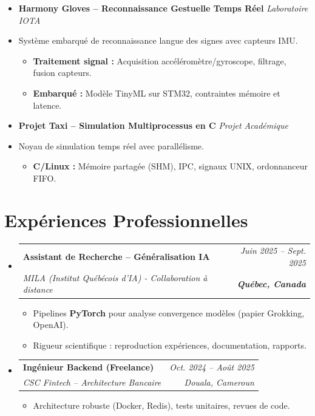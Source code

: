 \documentclass[a4paper,11pt]{article}
\makeatletter
\newcommand{\resumeSubheading}[4]{
  \vspace{-1pt}\item
    \begin{tabular*}{0.97\textwidth}[t]{l@{\extracolsep{\fill}}r}
      \textbf{#1} & \textit{\small #2} \\
      \textit{\small #3} & \textit{\small #4} \\
    \end{tabular*}\vspace{-5pt}
}
\makeatother
\begin{document}
\begin{itemize}[leftmargin=*, label={}]
\item \textbf{Harmony Gloves -- Reconnaissance Gestuelle Temps Réel} \hfill \textit{Laboratoire IOTA}
\vspace{-2pt}
\item \small{Système embarqué de reconnaissance langue des signes avec capteurs IMU.}
    \begin{itemize}[leftmargin=0.4cm, nosep, label=\tiny$\bullet$]
        \item \small{\textbf{Traitement signal :} Acquisition accéléromètre/gyroscope, filtrage, fusion capteurs.}
        \item \small{\textbf{Embarqué :} Modèle TinyML sur STM32, contraintes mémoire et latence.}
    \end{itemize}
    \vspace{3pt}

\item \textbf{Projet Taxi -- Simulation Multiprocessus en C} \hfill \textit{Projet Académique}
\vspace{-2pt}
\item \small{Noyau de simulation temps réel avec parallélisme.}
    \begin{itemize}[leftmargin=0.4cm, nosep, label=\tiny$\bullet$]
        \item \small{\textbf{C/Linux :} Mémoire partagée (SHM), IPC, signaux UNIX, ordonnanceur FIFO.}
    \end{itemize}

\end{itemize}

\section{Expériences Professionnelles}
\begin{itemize}[leftmargin=*, label={}]

    \resumeSubheading
      {Assistant de Recherche -- Généralisation IA}{Juin 2025 -- Sept. 2025}
      {MILA (Institut Québécois d'IA) - Collaboration à distance}{\textbf{Québec, Canada}}
      \begin{itemize}[leftmargin=0.4cm, nosep, label=\tiny$\bullet$]
        \item \small{Pipelines \textbf{PyTorch} pour analyse convergence modèles (papier Grokking, OpenAI).}
        \item \small{Rigueur scientifique : reproduction expériences, documentation, rapports.}
      \end{itemize}
    \vspace{2pt}

    \resumeSubheading
      {Ingénieur Backend (Freelance)}{Oct. 2024 -- Août 2025}
      {CSC Fintech -- Architecture Bancaire}{Douala, Cameroun}
      \begin{itemize}[leftmargin=0.4cm, nosep, label=\tiny$\bullet$]
        \item \small{Architecture robuste (Docker, Redis), tests unitaires, revues de code.}
      \end{itemize}
\end{itemize}
\end{document}
